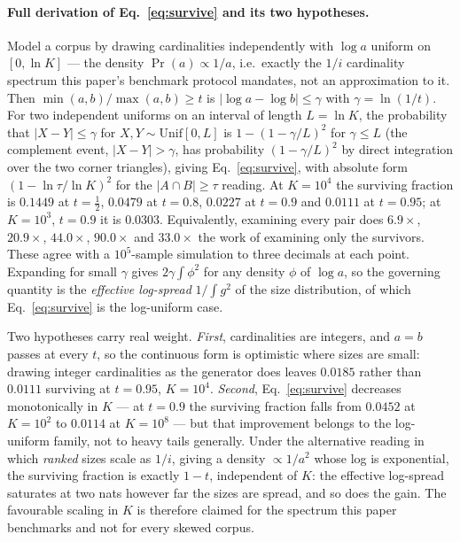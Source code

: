 \paragraph*{Full derivation of Eq.~\eqref{eq:survive} and its two hypotheses.}
Model a corpus by drawing cardinalities independently with $\log a$ uniform on $[0,\ln K]$ --- the
density $\Pr(a)\propto1/a$, i.e.\ exactly the $1/i$ cardinality spectrum this paper's benchmark
protocol mandates, not an approximation to it. Then $\min(a,b)/\max(a,b)\ge t$ is
$|\log a-\log b|\le\gamma$ with $\gamma=\ln(1/t)$. For two independent uniforms on an interval of
length $L=\ln K$, the probability that $|X-Y|\le\gamma$ for $X,Y\sim\mathrm{Unif}[0,L]$ is
$1-(1-\gamma/L)^2$ for $\gamma\le L$ (the complement event, $|X-Y|>\gamma$, has probability
$(1-\gamma/L)^2$ by direct integration over the two corner triangles), giving Eq.~\eqref{eq:survive},
with absolute form $(1-\ln\tau/\ln K)^2$ for the $|A\cap B|\ge\tau$ reading. At $K=10^4$ the surviving
fraction is $0.1449$ at $t=\tfrac12$, $0.0479$ at $t=0.8$, $0.0227$ at $t=0.9$ and $0.0111$ at
$t=0.95$; at $K=10^3$, $t=0.9$ it is $0.0303$. Equivalently, examining every pair does $6.9\times$,
$20.9\times$, $44.0\times$, $90.0\times$ and $33.0\times$ the work of examining only the survivors.
These agree with a $10^5$-sample simulation to three decimals at each point. Expanding for small
$\gamma$ gives $2\gamma\int\phi^2$ for any density $\phi$ of $\log a$, so the governing quantity is the
\emph{effective log-spread} $1/\!\int g^2$ of the size distribution, of which Eq.~\eqref{eq:survive} is
the log-uniform case.

Two hypotheses carry real weight. \emph{First}, cardinalities are integers, and $a=b$ passes at every
$t$, so the continuous form is optimistic where sizes are small: drawing integer cardinalities as the
generator does leaves $0.0185$ rather than $0.0111$ surviving at $t=0.95$, $K=10^4$. \emph{Second},
Eq.~\eqref{eq:survive} decreases monotonically in $K$ --- at $t=0.9$ the surviving fraction falls from
$0.0452$ at $K=10^2$ to $0.0114$ at $K=10^8$ --- but that improvement belongs to the log-uniform family,
not to heavy tails generally. Under the alternative reading in which \emph{ranked} sizes scale as
$1/i$, giving a density $\propto1/a^2$ whose log is exponential, the surviving fraction is exactly
$1-t$, independent of $K$: the effective log-spread saturates at two nats however far the sizes are
spread, and so does the gain. The favourable scaling in $K$ is therefore claimed for the spectrum this
paper benchmarks and not for every skewed corpus.

